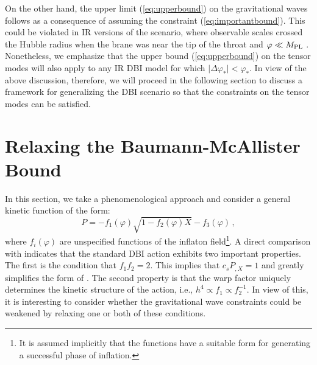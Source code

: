 On the other hand, 
the upper limit (\ref{eq:upperbound}) on the gravitational waves 
follows as a consequence of assuming 
the constraint (\ref{eq:importantbound}). This  
could be violated in IR versions of the scenario, where
observable scales crossed the Hubble radius when the 
brane was near the tip of the throat and $\varphi \ll M_{\mathrm{PL}}$
\cite{brane12,brane14}. 
Nonetheless, we emphasize that the upper bound (\ref{eq:upperbound})
on the tensor modes 
will also apply to any IR DBI model for which 
$|\Delta \varphi_* | < \varphi_*$.  
In view of the above discussion, therefore, 
we will proceed in the following section
to discuss a framework for generalizing the DBI scenario so 
that the constraints on the tensor modes can be satisfied. 
% 
% 
% 
% 
\section{Relaxing the Baumann-McAllister Bound}
% 
\label{sec:relaxing-dbi}
% 
In this section, we take a phenomenological 
approach and consider a general kinetic function of the form:
% 
\begin{equation}
\label{eq:genaction-dbi}
P= -f_1 (\varphi ) \sqrt{1-f_2 (\varphi ) X} -f_3 (\varphi) \,,
\end{equation}
% 
where $f_i (\varphi )$ are unspecified functions of the inflaton 
field\footnote{It is assumed 
implicitly that the functions have a suitable form for 
generating a successful phase of inflation.}.
A direct comparison with  
indicates that the standard DBI action exhibits two important properties. 
The first is the condition that $f_1 f_2 =2$. This implies that 
$c_sP_{,X} =1$ and greatly simplifies the form of . 
The second property is that the warp factor uniquely determines 
the kinetic structure of the action, i.e., $h^4 \propto f_1 \propto f_2^{-1}$.  
In view of this, it is interesting to consider whether
the gravitational wave constraints could be weakened by relaxing one 
or both of these conditions. 


